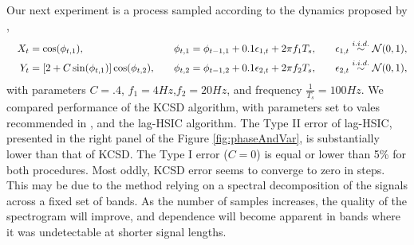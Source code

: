 Our next experiment is a process sampled according to the dynamics proposed by \cite{besserve_statistical_2013},      
\begin{alignat}{3}
  \quad X_t &= \cos(\phi_{t,1}),   &\quad  \phi_{t,1} &= \phi_{t-1,1} + 0.1\epsilon_{1,t} + 2 \pi f_1 T_s, &\quad  \epsilon_{1,t}  \overset{i.i.d.}{\sim} \mathcal N(0,1),  \label{eg:dymamics1a} \\  
  Y_t &= [2+C\sin(\phi_{t,1})]\cos(\phi_{t,2}),  &   \phi_{t,2} &= \phi_{t-1,2} + 0.1\epsilon_{2,t} + 2 \pi f_2 T_s , &  \epsilon_{2,t}  \overset{i.i.d.}{\sim} \mathcal N(0,1), \label{eg:dymamics1b}
\end{alignat}
with parameters $C=.4$, $f_1=4Hz$,$f_2=20Hz$, and frequency $\frac {1} {T_s} = 100 Hz$. We compared performance of the KCSD algorithm, with parameters set to vales recommended in \cite{besserve_statistical_2013}, and the lag-HSIC algorithm. The Type II error of lag-HSIC, presented in the right panel of the Figure \ref{fig:phaseAndVar}, is substantially lower than that of KCSD. The Type I error ($C=0$) is equal or lower than 5\% for both procedures. Most oddly, KCSD error seems to converge to zero in steps. This may be due to the method relying on a spectral decomposition of the signals across a fixed set of bands. As the number of samples increases, the quality of the spectrogram will improve, and dependence will become apparent in bands where it was undetectable at shorter signal lengths.
 
